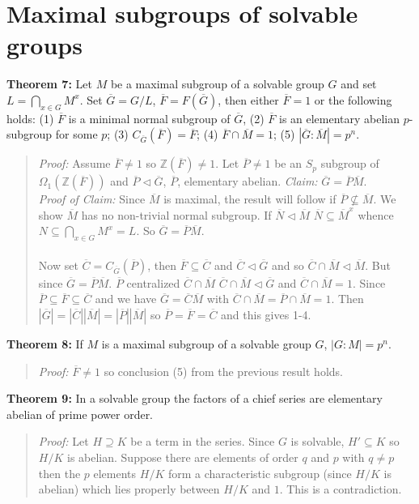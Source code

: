 \section{Maximal subgroups of solvable groups}
{\bf Theorem 7:}
Let $M$ be a maximal subgroup of a solvable group $G$ and set $L = \bigcap_{x \in G} M^x$.  Set 
${\overline G}= G/L$, ${\overline F} = F({\overline G})$, then either ${\overline F} = 1$
or the following holds:
(1) ${\overline F}$ is a minimal normal subgroup of ${\overline G}$,
(2) ${\overline F}$ is an elementary abelian $p$-subgroup for some $p$;
(3) $C_{\overline G}({\overline F}) = {\overline F}$;
(4) ${\overline F} \cap {\overline M} =1$;
(5) $|{\overline G} : {\overline M}|= p^n$.
\begin{quote}
\emph{Proof:}  
Assume ${\overline F} \ne 1$ so ${\mathbb Z}({\overline F}) \ne 1$.   Let
${\overline P} \ne 1$ be an $S_p$ subgroup of $\Omega_1({\mathbb Z}({\overline F}))$
and ${\overline P} \lhd {\overline G}$, ${\overline P}$, elementary abelian.
\emph{Claim:} ${\overline G}= {\overline P} {\overline M}$. 
\\
\emph{Proof of Claim:}
Since ${\overline M}$ is maximal, the result will follow if ${\overline P} \nsubseteq
{\overline M}$.  We show ${\overline M}$ has no non-trivial normal subgroup.
If ${\overline N} \lhd \overline{M}$
${\overline N} \subseteq {\overline M}^x$ whence
$N \subseteq \bigcap_{x \in G} M^x = L$.  So 
$\overline{G}= \overline{P} \overline{M}$. 
\\
\\
Now set ${\overline C}= C_{\overline G}({\overline P})$, then
${\overline F} \subseteq {\overline C}$ and ${\overline C} \lhd {\overline G}$ and so
${\overline C} \cap {\overline M} \lhd {\overline M}$.   But since
${\overline G}= {\overline P} {\overline M}$. 
${\overline P}$ centralized ${\overline C} \cap {\overline M}$
${\overline C} \cap {\overline M} \lhd {\overline G}$ and
${\overline C} \cap {\overline M} = 1$.
Since 
${\overline P} \subseteq  {\overline F} \subseteq {\overline C}$ and we have
${\overline G}= {\overline C} {\overline M}$
with
${\overline C} \cap {\overline M} = {\overline P} \cap {\overline M}  = 1$.  Then
$|{\overline G}| =  |{\overline C}| |{\overline M}| =  |{\overline P}| |{\overline M}| $
so
${\overline P} =  {\overline F} = {\overline C}$ and this gives 1-4.
\end{quote}
{\bf Theorem 8:}
If $M$ is a maximal subgroup of a solvable group $G$, $|G:M|= p^n$.
\begin{quote}
\emph{Proof:}  
${\overline F} \ne 1$ so
conclusion (5) from the previous result holds.
\end{quote}
{\bf Theorem 9:}
In a solvable group the factors of a chief series are elementary abelian of prime power order.
\begin{quote}
\emph{Proof:}  
Let $H \supseteq K$ be a term in the series.  Since $G$ is solvable, $H' \subseteq K$ so
$H/K$ is abelian.  Suppose there are elements of order $q$ and $p$ with $q \neq p$ then the $p$ elements
$H/K$ form a characteristic subgroup (since $H/K$ is abelian) which lies properly between $H/K$ and $1$.
This is a contradiction.
\end{quote}
